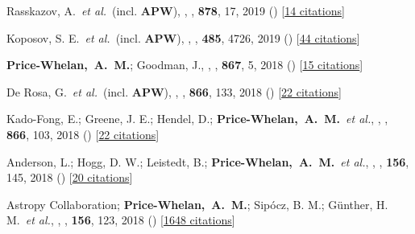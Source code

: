 \item[{\color{deemph}\scriptsize49}]Rasskazov, A.~\textit{et al.}~(incl. \textbf{APW}), , \apj, \textbf{878}, 17, 2019 () [\href{http://adsabs.harvard.edu/abs/2019ApJ...878...17R}{14 citations}]

\item[{\color{deemph}\scriptsize48}]Koposov, S. E.~\textit{et al.}~(incl. \textbf{APW}), , \mnras, \textbf{485}, 4726, 2019 () [\href{http://adsabs.harvard.edu/abs/2019MNRAS.485.4726K}{44 citations}]

\item[{\color{deemph}\scriptsize47}]\textbf{Price-Whelan,~A.~M.}; Goodman, J., , \apj, \textbf{867}, 5, 2018 () [\href{http://adsabs.harvard.edu/abs/2018ApJ...867....5P}{15 citations}]

\item[{\color{deemph}\scriptsize46}]De Rosa, G.~\textit{et al.}~(incl. \textbf{APW}), , \apj, \textbf{866}, 133, 2018 () [\href{http://adsabs.harvard.edu/abs/2018ApJ...866..133D}{22 citations}]

\item[{\color{deemph}\scriptsize45}]Kado-Fong, E.; Greene, J. E.; Hendel, D.; \textbf{Price-Whelan,~A.~M.}~\textit{et al.}, , \apj, \textbf{866}, 103, 2018 () [\href{http://adsabs.harvard.edu/abs/2018ApJ...866..103K}{22 citations}]

\item[{\color{deemph}\scriptsize44}]Anderson, L.; Hogg, D. W.; Leistedt, B.; \textbf{Price-Whelan,~A.~M.}~\textit{et al.}, , \aj, \textbf{156}, 145, 2018 () [\href{http://adsabs.harvard.edu/abs/2018AJ....156..145A}{20 citations}]

\item[{\color{deemph}\scriptsize43}]Astropy Collaboration; \textbf{Price-Whelan,~A.~M.}; Sip{\'{o}}cz, B. M.; G{\"u}nther, H. M.~\textit{et al.}, , \aj, \textbf{156}, 123, 2018 () [\href{http://adsabs.harvard.edu/abs/2018AJ....156..123A}{1648 citations}]

